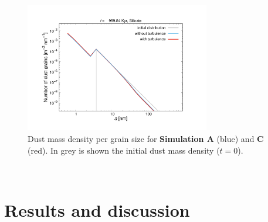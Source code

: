 \documentclass[fleqn,usenatbib]{mnras}
\begin{document}
  \begin{figure}
 \includegraphics[trim=1.4cm 1.3cm 3.4cm 3.0cm, clip=true,page=1,height = 5.7cm, page=2 ]{Pics/Pics_A2/Particlenumbers_04000_compare.pdf}
  \caption{Dust mass density per grain size for \textbf{Simulation A} (blue) and \textbf{C} (red). In grey is shown the initial dust mass density ($t=0$).}
  \label{fig_A2C2_osizedistribution}  
  \end{figure}  
\newpage~
\newpage~
\newpage~
\newpage
\section{Results and discussion}
\end{document}
